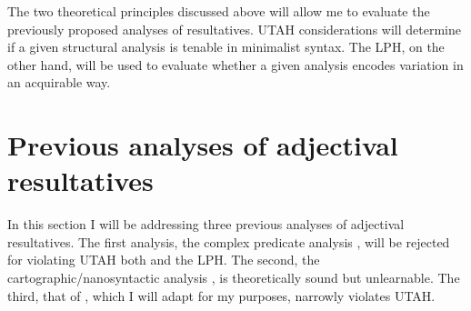 \documentclass[MilwayThesis]{subfiles}
\begin{document}
%
%
%
%
%
%

The two theoretical principles discussed above will allow me to evaluate the previously proposed analyses of resultatives.
UTAH considerations will determine if a given structural analysis is tenable in minimalist syntax.
The LPH, on the other hand, will be used to evaluate whether a given analysis encodes variation in an acquirable way.

\section{Previous analyses of adjectival resultatives}
In this section I will be addressing three previous analyses of adjectival resultatives.
The first analysis, the complex predicate analysis \parencite{snyder1995language,irimia2012secondary}, will be rejected for violating UTAH both and the LPH.
The second, the cartographic/nanosyntactic analysis \parencite{son2008microparameters}, is theoretically sound but unlearnable.
The third, that of \textcite{kratzer2004building}, which I will adapt for my purposes, narrowly violates UTAH.
\end{document}
